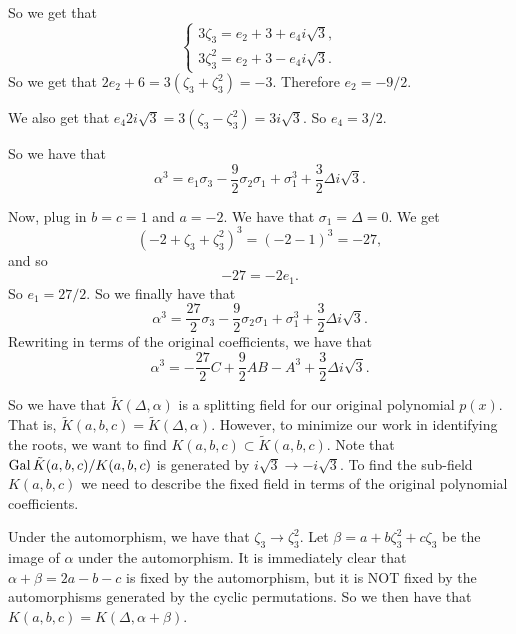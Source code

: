 So we get that
\begin{equation}
\begin{cases}
    3\zeta_3 = e_2 + 3 + e_4i\sqrt{3}, \\
    3\zeta_3^2 = e_2 + 3 - e_4i\sqrt{3}.
\end{cases}
\end{equation}
So we get that \(2e_2 + 6 = 3(\zeta_3 + \zeta_3^2) = -3\). Therefore \(e_2 = -9/2\).

We also get that \(e_4 2i\sqrt{3} = 3(\zeta_3 - \zeta_3^2) = 3i\sqrt{3}\). So \(e_4 = 3 / 2\). 

So we have that
\begin{equation}
\alpha^3 = e_1 \sigma_3 - \frac{9}{2} \sigma_2 \sigma_1 + \sigma_1^3
    + \frac{3}{2} \Delta i\sqrt{3}.
\end{equation}

Now, plug in \(b = c = 1\) and \(a = -2\). We have that \(\sigma_1 = \Delta = 0\). We get
\begin{equation}
(-2 + \zeta_3 + \zeta_3^2)^3 = (-2 - 1)^3 = -27,
\end{equation}
and so
\begin{equation}
-27 = -2 e_1.
\end{equation}
So \(e_1 = 27/2\). So we finally have that
\begin{equation}
\alpha^3 = \frac{27}{2} \sigma_3 - \frac{9}{2} \sigma_2 \sigma_1 + \sigma_1^3
    + \frac{3}{2} \Delta i\sqrt{3}.
\end{equation}
Rewriting in terms of the original coefficients, we have that
\begin{equation}
\alpha^3 = -\frac{27}{2} C + \frac{9}{2} AB - A^3
    + \frac{3}{2} \Delta i\sqrt{3}.
\end{equation}

So we have that \(\tilde K(\Delta, \alpha)\) is a splitting field for our original polynomial \(p(x)\).
That is, \(\tilde K(a, b, c) = \tilde K(\Delta, \alpha)\). However, to minimize our work in identifying
the roots, we want to find \(K(a,b,c) \subset \tilde K(a, b, c)\). Note that 
\(\operatorname{Gal} \tilde K(a,b,c) / K(a,b,c)\) is generated by \(i\sqrt{3} \to -i\sqrt{3}\). To find the
sub-field \(K(a,b,c)\) we need to describe the fixed field in terms of the original 
polynomial coefficients.

Under the automorphism, we have that \(\zeta_3 \to \zeta_3^2\). Let \(\beta = a + b\zeta_3^2 + c \zeta_3\)
be the image of \(\alpha\) under the automorphism. It is immediately clear that \(\alpha + \beta = 2a - b -c\)
is fixed by the automorphism, but it is NOT fixed by the automorphisms generated by the cyclic permutations.
So we then have that \(K(a, b, c) = K(\Delta, \alpha + \beta)\).

